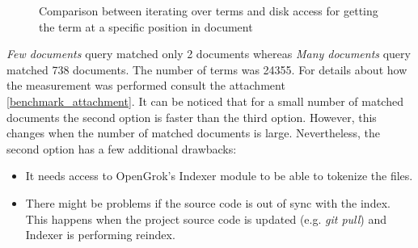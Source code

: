 \begin{figure}[htbp]
    \centering
    \caption{Comparison between iterating over terms and disk access for getting the term at a specific position in document}
    \label{comp_phrase}
\end{figure}

\textit{Few documents} query matched only 2 documents whereas \textit{Many documents} query matched 738 documents.
The number of terms was 24355. For details about how the measurement was performed consult the attachment
\ref{benchmark_attachment}.
It can be noticed that for a small number of matched documents the second option is
faster than the third option. However, this changes when the number of matched documents is large. Nevertheless,
the second option has a few additional drawbacks:
\begin{itemize}
    \item It needs access to OpenGrok's Indexer module to be able to tokenize the files.
    \item There might be problems if the source code is out of sync with the index. This happens when the project source code
    is updated (e.g. \textit{git pull}) and Indexer is performing reindex.
\end{itemize}

